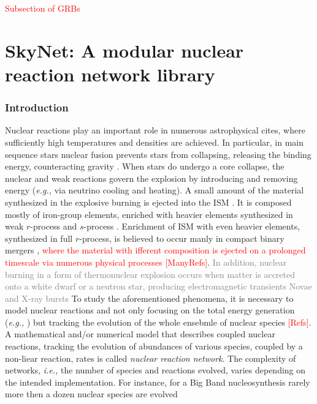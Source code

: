 \documentclass[11pt,a4paper,headinclude=true,DIV=14,BCOR=8mm,chapterprefix,listof=totoc,twoside,openright,abstracton]{scrbook}
\newcommand{\red}[1]{\textcolor{red}{#1}}
\newcommand{\gray}[1]{\textcolor{gray}{#1}}
\begin{document}
\red{Subsection of GRBs}
\cite{Lee:2007js,Nakar:2007yr,Gehrels:2009,Fernandez:2015use}



\section{SkyNet: A modular nuclear reaction network library}


\subsubsection{Introduction}

Nuclear reactions play an important role in numerous astrophysical cites, where sufficiently high temperatures and densities are achieved. In particular, in main sequence stars nuclear fusion prevents stars from collapsing, releasing the binding energy, counteracting gravity \cite{Bethe:1939}. When stars do undergo a core collapse, the nuclear and weak reactions govern the explosion by introducing and removing energy (\textit{e.g.,} via neutrino cooling and heating). 
%
A small amount of the material synthesized in the explosive burning is ejected into the ISM  \cite{Nomoto:1997if,Woosley:2002}. It is composed mostly of iron-group elements, enriched with heavier elements synthesized in weak $r$-process \cite{Wanajo:2013} and $s$-process \cite{Burbidge:1957}. 
Enrichment of ISM with even heavier elements, synthesized in full $r$-process, is believed to occur manly in compact binary mergers \cite{Freiburghaus:1999}, \red{where the material with ifferent composition is ejected on a prolonged timescale via numerous physical processes [ManyRefs]}. \gray{In addition, nuclear burning in a form of thermonuclear explosion occurs when matter is accreted onto a white dwarf or a neutron star, producing electromagnetic transients Novae and X-ray bursts \cite{Boyd:2008,Freiburghaus:1999}}
%
To study the aforementioned phenomena, it is necessary to model nuclear reactions and not only focusing on the total energy generation (\textit{e.g.,}  \cite{Weaver:1978,Mueller:1986,Timmes:1999}) but tracking the evolution of the whole ensebmle of nuclear species \red{[Refs]}. A mathematical and/or numerical model that describes coupled nuclear reactions, tracking the evolution of abundances of various species, coupled by a non-liear reaction, rates is called \textit{nuclear reaction network}.
The complexity of networks, \textit{i.e.,} the number of species and reactions evolved, varies depending on the intended implementation. For instance, for a Big Band nucleosynthesis rarely more then a dozen nuclear species are evolved 
\end{document}

